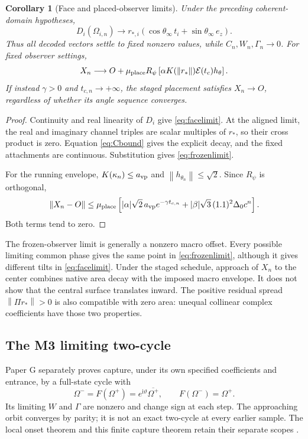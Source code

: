 \documentclass[11pt,a4paper]{article}
\numberwithin{equation}{section}
\newtheorem{corollary}[proposition]{Corollary}
\theoremstyle{definition}
\theoremstyle{remark}
\newcommand{\iu}{\mathrm i}
\newcommand{\norm}[1]{\left\lVert#1\right\rVert}
\newcommand{\envelope}{\mathcal E}
\newcommand{\muplace}{\mu_{\rm place}}
\begin{document}
\begin{corollary}[Face and placed-observer limits]\label{cor:limits}
Under the preceding coherent-domain hypotheses,
\begin{equation}\label{eq:facelimit}
D_i(\Omega_{i,n})\longrightarrow
r_{*,i}(\cos\theta_\infty\,t_i+\sin\theta_\infty\,e_z).
\end{equation}
Thus all decoded vectors settle to fixed nonzero values, while
$C_n,W_n,\Gamma_n\to0$.
For fixed observer settings,
\begin{equation}\label{eq:frozenlimit}
X_n\longrightarrow
O+\muplace R_\psi
 \left[\alpha K(\norm{r_*})\envelope(t_c)h_\theta\right].
\end{equation}
If instead $\gamma>0$ and $t_{c,n}\to+\infty$, the staged placement
satisfies $X_n\to O$, regardless of whether its angle sequence converges.
\end{corollary}
\begin{proof}
Continuity and real linearity of $D_i$ give \eqref{eq:facelimit}.
At the aligned limit, the real and imaginary channel triples are scalar
multiples of $r_*$, so their cross product is zero. Equation
\eqref{eq:Cbound} gives the explicit decay, and the fixed attachments are
continuous. Substitution gives \eqref{eq:frozenlimit}.

For the running envelope, $K(\kappa_n)\le a_{\rm vp}$ and
$\norm{h_{\theta_n}}\le\sqrt2$. Since $R_\psi$ is orthogonal,
\begin{equation}\label{eq:placedbound}
\norm{X_n-O}\le\muplace\left[
 |\alpha|\sqrt2\,a_{\rm vp}e^{-\gamma t_{c,n}}
 +|\beta|\sqrt3\,(1.1)^2\Delta_0c^n\right].
\end{equation}
Both terms tend to zero.
\end{proof}

The frozen-observer limit is generally a nonzero macro offset. Every
possible limiting common phase gives the same point in
\eqref{eq:frozenlimit}, although it gives different tilts in
\eqref{eq:facelimit}. Under the staged schedule, approach of $X_n$ to the
center combines native area decay with the imposed macro envelope. It
does not show that the central surface translates inward. The positive
residual spread $\norm{\Pi r_*}>0$ is also compatible with zero area:
unequal collinear complex coefficients have those two properties.

\subsection{The M3 limiting two-cycle}
Paper G separately proves capture, under its own specified coefficients
and entrance, by a full-state cycle with
\begin{equation}\label{eq:M3}
\Omega^-=F(\Omega^+)=e^{\iu\vartheta}\overline{\Omega^+},
\qquad F(\Omega^-)=\Omega^+.
\end{equation}
Its limiting $W$ and $\Gamma$ are nonzero and change sign at each step.
The approaching orbit converges by parity; it is not an exact two-cycle at
every earlier sample. The local onset theorem and this finite capture
theorem retain their separate scopes \cite{PaperG}.
\end{document}
